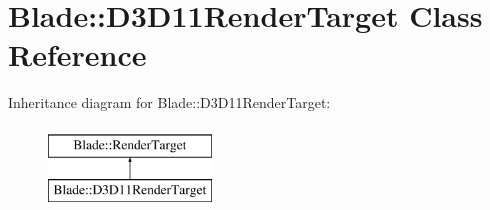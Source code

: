 \hypertarget{class_blade_1_1_d3_d11_render_target}{}\section{Blade\+:\+:D3\+D11\+Render\+Target Class Reference}
\label{class_blade_1_1_d3_d11_render_target}
Inheritance diagram for Blade\+:\+:D3\+D11\+Render\+Target\+:\begin{figure}[H]
\begin{center}
\leavevmode
\includegraphics[height=2.000000cm]{class_blade_1_1_d3_d11_render_target}
\end{center}
\end{figure}
